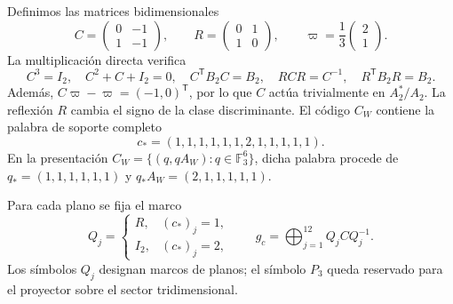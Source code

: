 Definimos las matrices bidimensionales
\[
 C=\begin{pmatrix}0&-1\\1&-1\end{pmatrix},
 \qquad
 R=\begin{pmatrix}0&1\\1&0\end{pmatrix},
 \qquad
 \varpi=\frac13\begin{pmatrix}2\\1\end{pmatrix}.
\]
La multiplicación directa verifica
\[
 C^3=I_2,\quad C^2+C+I_2=0,\quad
 C^{\mathsf T}B_2C=B_2,\quad
 RCR=C^{-1},\quad R^{\mathsf T}B_2R=B_2.
\]
Además, \(C\varpi-\varpi=(-1,0)^{\mathsf T}\), por lo que \(C\)
actúa trivialmente en \(A_2^*/A_2\). La reflexión \(R\) cambia el signo
de la clase discriminante. El código \(C_W\) contiene la palabra de
soporte completo
\[
 c_*=(1,1,1,1,1,1,2,1,1,1,1,1).
\]
En la presentación \(C_W=\{(q,qA_W):q\in\mathbb F_3^6\}\), dicha
palabra procede de \(q_*=(1,1,1,1,1,1)\) y
\(q_*A_W=(2,1,1,1,1,1)\).

Para cada plano se fija el marco
\begin{equation}
 Q_j=\begin{cases}
 R,&(c_*)_j=1,\\
 I_2,&(c_*)_j=2,
 \end{cases}
 \qquad
 g_c=\bigoplus_{j=1}^{12}Q_jCQ_j^{-1}.
 \label{eq:leech-c3}
\end{equation}
Los símbolos \(Q_j\) designan marcos de planos; el símbolo \(P_3\)
queda reservado para el proyector sobre el sector tridimensional.

